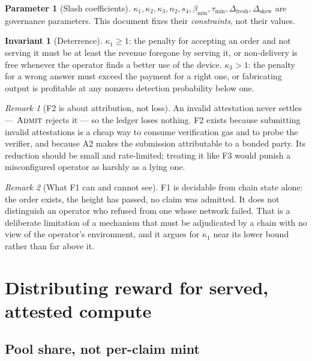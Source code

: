 \documentclass[11pt,a4paper]{article}
\theoremstyle{definition}
\newtheorem{invariant}{Invariant}[section]
\newtheorem{parameter}{Parameter}[section]
\theoremstyle{remark}
\newtheorem{remark}{Remark}[section]
\newcommand{\Admit}{\textsc{Admit}}
\begin{document}
\begin{parameter}[Slash coefficients]
$\kappa_1, \kappa_2, \kappa_3, n_2, s_4, \beta_{\min}, \tau_{\min},
\Delta_{\text{fresh}}, \Delta_{\text{skew}}$ are governance parameters. This
document fixes their \emph{constraints}, not their values.
\end{parameter}

\begin{invariant}[Deterrence]
\label{inv:deterrence}
$\kappa_1 \ge 1$: the penalty for accepting an order and not serving it must be
at least the revenue foregone by serving it, or non-delivery is free whenever
the operator finds a better use of the device. $\kappa_3 > 1$: the penalty for a
wrong answer must exceed the payment for a right one, or fabricating output is
profitable at any nonzero detection probability below one.
\end{invariant}

\begin{remark}[F2 is about attribution, not loss]
An invalid attestation never settles --- $\Admit$ rejects it --- so the ledger
loses nothing. F2 exists because submitting invalid attestations is a cheap way
to consume verification gas and to probe the verifier, and because A2 makes the
submission attributable to a bonded party. Its reduction should be small and
rate-limited; treating it like F3 would punish a misconfigured operator as
harshly as a lying one.
\end{remark}

\begin{remark}[What F1 can and cannot see]
F1 is decidable from chain state alone: the order exists, the height has passed,
no claim was admitted. It does not distinguish an operator who refused from one
whose network failed. That is a deliberate limitation of a mechanism that must
be adjudicated by a chain with no view of the operator's environment, and it
argues for $\kappa_1$ near its lower bound rather than far above it.
\end{remark}

\section{Distributing reward for served, attested compute}
\label{sec:reward}

\subsection{Pool share, not per-claim mint}
\end{document}
